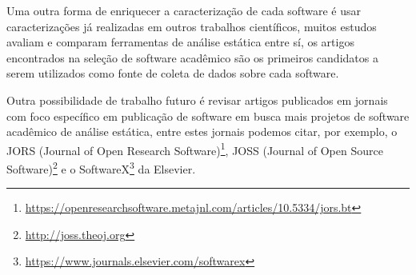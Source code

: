 
Uma outra forma de enriquecer a caracterização de cada software é usar
caracterizações já realizadas em outros trabalhos científicos, muitos estudos
avaliam e comparam ferramentas de análise estática entre sí, os artigos
encontrados na seleção de software acadêmico são os primeiros candidatos a
serem utilizados como fonte de coleta de dados sobre cada software.



Outra possibilidade de trabalho futuro é revisar artigos publicados em jornais
com foco específico em publicação de software em busca mais projetos de
software acadêmico de análise estática, entre estes jornais podemos citar, por
exemplo, o JORS (Journal of Open Research
Software)\footnote{\url{https://openresearchsoftware.metajnl.com/articles/10.5334/jors.bt}},
JOSS (Journal of Open Source Software)\footnote{\url{http://joss.theoj.org}} e
o SoftwareX\footnote{\url{https://www.journals.elsevier.com/softwarex}} da
Elsevier. 

%
%
